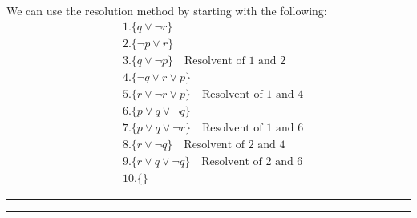 \documentclass[12pt,letterpaper, onecolumn]{exam}
\begin{document}
\begin{questions}
	We can use the resolution method by starting with the following:
	\begin{align*}
		& 1. \{ q \lor \neg r \} \\
		& 2. \{ \neg p \lor r \} \\
		& 3. \{ q \lor \neg p \} \quad \text{Resolvent of 1 and 2} \\
		& 4. \{ \neg q \lor r \lor p \} \\
		& 5. \{ r \lor \neg r \lor p \} \quad \text{Resolvent of 1 and 4} \\
		& 6. \{ p \lor q \lor \neg q \} \\
		& 7. \{ p \lor q \lor \neg r \} \quad \text{Resolvent of 1 and 6} \\
		& 8. \{ r \lor \neg q \} \quad \text{Resolvent of 2 and 4} \\
		& 9. \{ r \lor q \lor \neg q \} \quad \text{Resolvent of 2 and 6} \\
		& 10. \{  \}
	\end{align*}

    {\rule{17cm}{0.4pt}}
	\question[]
	\solutiontitle

    {\rule{17cm}{0.4pt}}

\end{questions}
\end{document}

